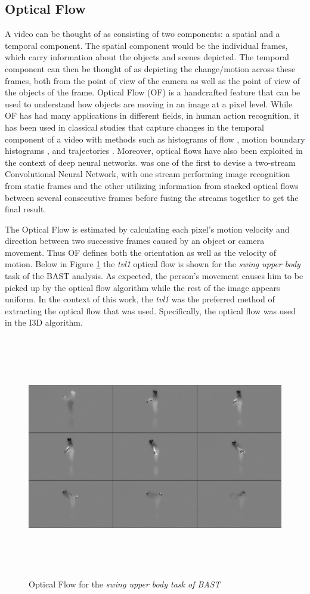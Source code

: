\documentclass[extern,palatino]{cgMA}
\begin{document}
\subsection{Optical Flow}
\label{background_optical_flow}
A video can be thought of as consisting of two components: a spatial and a temporal component. The spatial component would be the individual frames, which carry information about the objects and scenes depicted. The temporal component can then be thought of as depicting the change/motion across these frames, both from the point of view of the camera as well as the point of view of the objects of the frame. Optical Flow (OF) is a handcrafted feature that can be used to understand how objects are moving in an image at a pixel level. While OF has had many applications in different fields, in human action recognition, it has been used in classical studies that capture changes in the temporal component of a video with methods such as histograms of flow \cite{laptev2008learning}, motion boundary histograms \cite{dalal2006human}, and trajectories \cite{wang2013action}. Moreover, optical flows have also been exploited in the context of deep neural networks. \cite{simonyan2014two} was one of the first to devise a two-stream Convolutional Neural Network, with one stream performing image recognition from static frames and the other utilizing information from stacked optical flows between several consecutive frames before fusing the streams together to get the final result.

The Optical Flow is estimated by calculating each pixel's motion velocity and direction between two successive frames caused by an object or camera movement. Thus OF defines both the orientation as well as the velocity of motion. Below in Figure \ref{flow_swing_figure} the \textit{tvl1} optical flow \cite{perez2013tv} is shown for the \textit{swing upper body} task of the BAST analysis. As expected, the person's movement causes him to be picked up by the optical flow algorithm while the rest of the image appears uniform. In the context of this work, the \textit{tvl1} was the preferred method of extracting the optical flow that was used. Specifically, the optical flow was used in the I3D algorithm.

\begin{figure}[h]
\center
\includegraphics[height={300pt}, width={420pt}]{images/flow_swing.jpg}
\caption{Optical Flow for the \textit{swing upper body task of BAST}}
\label{flow_swing_figure}
\end{figure}
\end{document}

